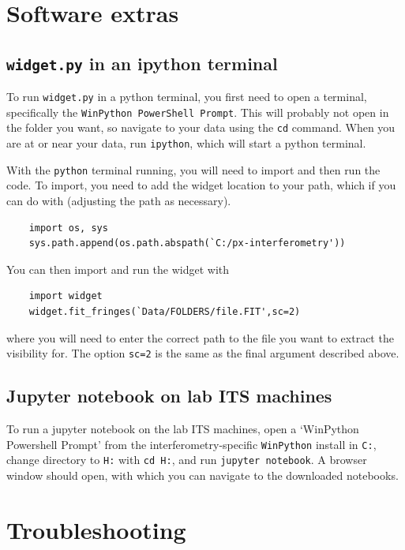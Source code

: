 \documentclass[11pt]{article}
\begin{document}
\clearpage

\section{Software extras}

\subsection{\texttt{widget.py} in an ipython terminal}\label{sec:widget_ipython}

To run \texttt{widget.py} in a python terminal, you first need to open a terminal, specifically the \texttt{WinPython PowerShell Prompt}. This will probably not open in the folder you want, so navigate to your data using the \texttt{cd} command. When you are at or near your data, run \texttt{ipython}, which will start a python terminal.

With the \texttt{python} terminal running, you will need to import and then run the code. To import, you need to add the widget location to your path, which if you can do with (adjusting the path as necessary).
\begin{verbatim}
    import os, sys
    sys.path.append(os.path.abspath(`C:/px-interferometry'))
\end{verbatim}
You can then import and run the widget with
\begin{verbatim}
    import widget
    widget.fit_fringes(`Data/FOLDERS/file.FIT',sc=2)
\end{verbatim}
where you will need to enter the correct path to the file you want to extract the visibility for. The option \texttt{sc=2} is the same as the final argument described above.

\subsection{Jupyter notebook on lab ITS machines}\label{sec:jupyter_its}

To run a jupyter notebook on the lab ITS machines, open a `WinPython Powershell Prompt' from the interferometry-specific \texttt{WinPython} install in \texttt{C:}, change directory to \texttt{H:} with \texttt{cd H:}, and run \texttt{jupyter notebook}. A browser window should open, with which you can navigate to the downloaded notebooks.

\clearpage

\section{Troubleshooting}
\end{document}
